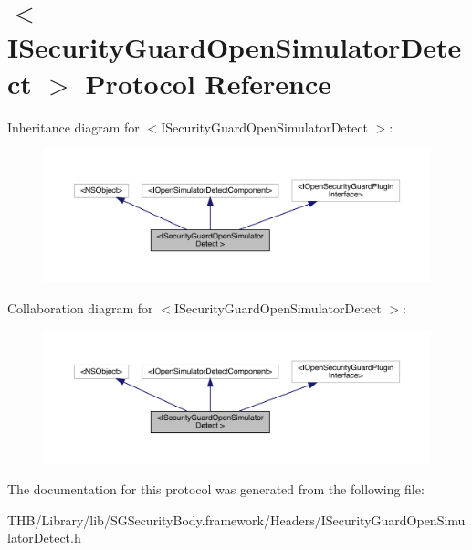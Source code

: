 \hypertarget{protocol_i_security_guard_open_simulator_detect_01-p}{}\section{$<$I\+Security\+Guard\+Open\+Simulator\+Detect $>$ Protocol Reference}
\label{protocol_i_security_guard_open_simulator_detect_01-p}


Inheritance diagram for $<$I\+Security\+Guard\+Open\+Simulator\+Detect $>$\+:\nopagebreak
\begin{figure}[H]
\begin{center}
\leavevmode
\includegraphics[width=350pt]{protocol_i_security_guard_open_simulator_detect_01-p__inherit__graph}
\end{center}
\end{figure}


Collaboration diagram for $<$I\+Security\+Guard\+Open\+Simulator\+Detect $>$\+:\nopagebreak
\begin{figure}[H]
\begin{center}
\leavevmode
\includegraphics[width=350pt]{protocol_i_security_guard_open_simulator_detect_01-p__coll__graph}
\end{center}
\end{figure}


The documentation for this protocol was generated from the following file\+:\begin{DoxyCompactItemize}
\item 
T\+H\+B/\+Library/lib/\+S\+G\+Security\+Body.\+framework/\+Headers/I\+Security\+Guard\+Open\+Simulator\+Detect.\+h\end{DoxyCompactItemize}
